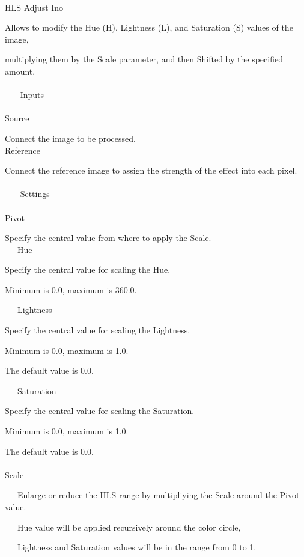 \documentclass[a4paper,12pt]{article}
\begin{document}
\thispagestyle{empty}

\Large
\noindent \\
HLS Adjust Ino\medskip
\par
\normalsize
Allows to modify the Hue (H), Lightness (L), and Saturation (S) values of the image,\par 
multiplying them by the Scale parameter, and then Shifted by the specified amount.\\
\\
-{-}- \ Inputs \ -{-}-\\
\\
Source\par
Connect the image to be processed.\\
Reference\par
Connect the reference image to assign the strength of the effect into each pixel.\\
\\
-{-}- \ Settings \ -{-}-\\
\\
Pivot\par
Specify the central value from where to apply the Scale.\\

\noindent \ \ \, Hue\par
Specify the central value for scaling the Hue.\par
Minimum is 0.0, maximum is 360.0.\par
\noindent \ \ \, Lightness\par
Specify the central value for scaling the Lightness.\par
Minimum is 0.0, maximum is 1.0.\par
The default value is 0.0.\par
\noindent \ \ \, Saturation\par
Specify the central value for scaling the Saturation.\par
Minimum is 0.0, maximum is 1.0.\par
The default value is 0.0.\\
\\
Scale\par
\noindent \ \ \, Enlarge or reduce the HLS range by multipliying the Scale around the Pivot value.\par
\noindent \ \ \, Hue value will be applied recursively around the color circle,\par
\noindent \ \ \, Lightness and Saturation values will be in the range from 0 to 1.\\
\end{document}
